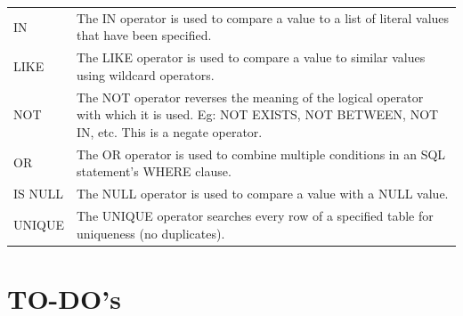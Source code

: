 \documentclass[]{book}
\theoremstyle{definition}
\theoremstyle{definition}
\theoremstyle{definition}
\theoremstyle{remark}
\begin{document}
\begin{longtable}[]{@{}ll@{}}
\begin{minipage}[t]{0.08\columnwidth}
IN\strut
\end{minipage} & \begin{minipage}[t]{0.86\columnwidth}\raggedright
The IN operator is used to compare a value to a list of literal values
that have been specified.\strut
\end{minipage}\tabularnewline
\begin{minipage}[t]{0.08\columnwidth}\raggedright
LIKE\strut
\end{minipage} & \begin{minipage}[t]{0.86\columnwidth}\raggedright
The LIKE operator is used to compare a value to similar values using
wildcard operators.\strut
\end{minipage}\tabularnewline
\begin{minipage}[t]{0.08\columnwidth}\raggedright
NOT\strut
\end{minipage} & \begin{minipage}[t]{0.86\columnwidth}\raggedright
The NOT operator reverses the meaning of the logical operator with which
it is used. Eg: NOT EXISTS, NOT BETWEEN, NOT IN, etc. This is a negate
operator.\strut
\end{minipage}\tabularnewline
\begin{minipage}[t]{0.08\columnwidth}\raggedright
OR\strut
\end{minipage} & \begin{minipage}[t]{0.86\columnwidth}\raggedright
The OR operator is used to combine multiple conditions in an SQL
statement's WHERE clause.\strut
\end{minipage}\tabularnewline
\begin{minipage}[t]{0.08\columnwidth}\raggedright
IS NULL\strut
\end{minipage} & \begin{minipage}[t]{0.86\columnwidth}\raggedright
The NULL operator is used to compare a value with a NULL value.\strut
\end{minipage}\tabularnewline
\begin{minipage}[t]{0.08\columnwidth}\raggedright
UNIQUE\strut
\end{minipage} & \begin{minipage}[t]{0.86\columnwidth}\raggedright
The UNIQUE operator searches every row of a specified table for
uniqueness (no duplicates).\strut
\end{minipage}\tabularnewline
\bottomrule
\end{longtable}

\hypertarget{to-dos}{%
\section{TO-DO's}\label{to-dos}}
\end{document}
